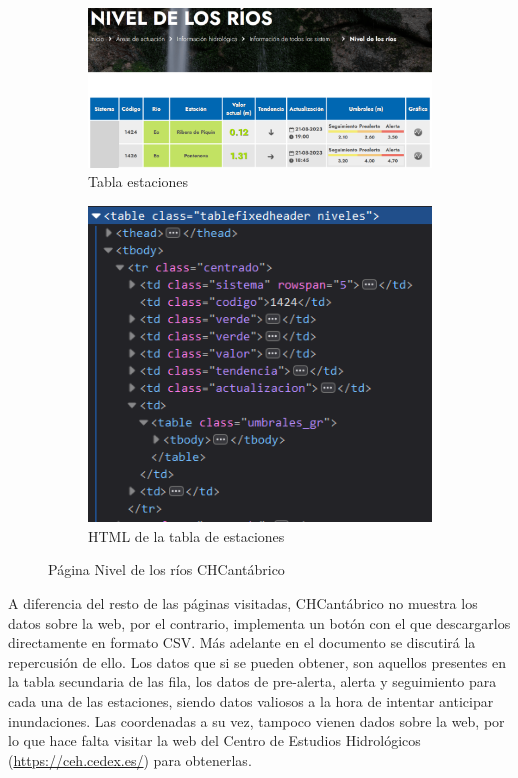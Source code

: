 \begin{figure} [H]
	\centering
	\begin{subfigure}{.5\textwidth}
		\centering
		\includegraphics[width=.7\linewidth]{fig/CHCantabricoCode.png}
		\caption{Tabla estaciones}
		\label{fig:sub9}
	\end{subfigure}%
	\begin{subfigure}{.5\textwidth}
		\centering
		\includegraphics[width=.7\linewidth]{fig/CHCantabricoCodeHTML.png}
		\caption{HTML de la tabla de estaciones}
		\label{fig:sub10}
	\end{subfigure}
	\caption{Página Nivel de los ríos CHCantábrico}
	\label{fig:ej30}
\end{figure}

A diferencia del resto de las páginas visitadas, CHCantábrico no muestra los datos sobre la web, por el contrario, implementa un botón con el que descargarlos directamente en formato CSV. Más adelante en el documento se discutirá la repercusión de ello.\newline
\newline
Los datos que si se pueden obtener, son aquellos presentes en la tabla secundaria de las fila, los datos de pre-alerta, alerta y seguimiento para cada una de las estaciones, siendo datos valiosos a la hora de intentar anticipar inundaciones.\newline
\newline
Las coordenadas a su vez, tampoco vienen dados sobre la web, por lo que hace falta visitar la web del Centro de Estudios Hidrológicos (\url{https://ceh.cedex.es/}) para obtenerlas.

